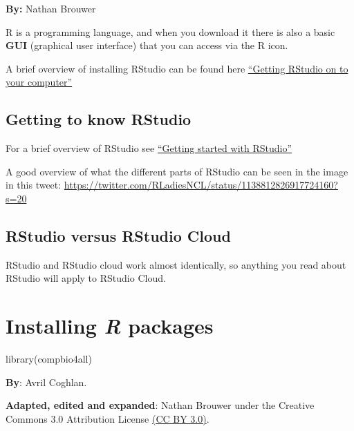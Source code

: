 \documentclass[
]{book}
\newenvironment{Shaded}{\begin{snugshade}}{\end{snugshade}}
\newcommand{\FunctionTok}[1]{\textcolor[rgb]{0.00,0.00,0.00}{#1}}
\newcommand{\NormalTok}[1]{#1}
\begin{document}
\textbf{By:} Nathan Brouwer

R is a programming language, and when you download it there is also a basic \textbf{GUI} (graphical user interface) that you can access via the R icon.

A brief overview of installing RStudio can be found here \href{https://brouwern.github.io/BOOK_R_Ecological_Data_Science/getting-rstudio-on-to-your-computer.html}{``Getting RStudio on to your computer''}

\hypertarget{getting-to-know-rstudio}{%
\section{Getting to know RStudio}\label{getting-to-know-rstudio}}

For a brief overview of RStudio see \href{https://brouwern.github.io/BOOK_R_Ecological_Data_Science/getting-started-with-rstudio.html}{``Getting started with RStudio''}

A good overview of what the different parts of RStudio can be seen in the image in this tweet: \url{https://twitter.com/RLadiesNCL/status/1138812826917724160?s=20}

\hypertarget{rstudio-versus-rstudio-cloud}{%
\section{RStudio versus RStudio Cloud}\label{rstudio-versus-rstudio-cloud}}

RStudio and RStudio cloud work almost identically, so anything you read about RStudio will apply to RStudio Cloud.

\hypertarget{installing-r-packages}{%
\chapter{\texorpdfstring{Installing \emph{R} packages}{Installing R packages}}\label{installing-r-packages}}

\begin{Shaded}
\begin{Highlighting}[]
\FunctionTok{library}\NormalTok{(compbio4all)}
\end{Highlighting}
\end{Shaded}

\textbf{By}: Avril Coghlan.

\textbf{Adapted, edited and expanded}: Nathan Brouwer under the Creative Commons 3.0 Attribution License \href{https://creativecommons.org/licenses/by/3.0/}{(CC BY 3.0)}.
\end{document}
